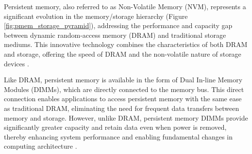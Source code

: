 Persistent memory, also referred to as Non-Volatile Memory (NVM), represents a significant evolution in the memory/storage hierarchy (Figure \ref{fig:pmem_storage_pyramid}), addressing the performance and capacity gap between dynamic random-access memory (DRAM) and traditional storage mediums. This innovative technology combines the characteristics of both DRAM and storage, offering the speed of DRAM and the non-volatile nature of storage devices \cite{scargall2020pmem}.

Like DRAM, persistent memory is available in the form of Dual In-line Memory Modules (DIMMs), which are directly connected to the memory bus. This direct connection enables applications to access persistent memory with the same ease as traditional DRAM, eliminating the need for frequent data transfers between memory and storage. However, unlike DRAM, persistent memory DIMMs provide significantly greater capacity and retain data even when power is removed, thereby enhancing system performance and enabling fundamental changes in computing architecture \cite{rudoff2017persistent,scargall2020pmem}.


